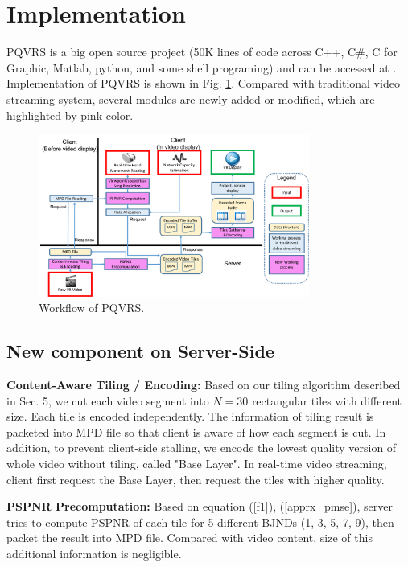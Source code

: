 \section{Implementation}

PQVRS is a big open source project (50K lines of code across C++, C\#, C for Graphic, Matlab, python, and some shell programing) and can be accessed at \cite{github}. Implementation of PQVRS is shown in Fig. \ref{implementation}. Compared with traditional video streaming system, several modules are newly added or modified, which are highlighted by pink color.

\begin{figure}
  \centering
  \includegraphics[width=3.5in]{images/implementation.pdf}
  \caption{Workflow of PQVRS.}
  \label{implementation}
  \end{figure}

\subsection{New component on Server-Side}

\textbf{Content-Aware Tiling / Encoding:} Based on our tiling algorithm described in Sec. 5, we cut each video segment into $N = 30$ rectangular tiles with different size. Each tile is encoded independently. The information of tiling result is packeted into MPD file so that client is aware of how each segment is cut. In addition, to prevent client-side stalling, we encode the lowest quality version of whole video without tiling, called "Base Layer".\cite{buffer} In real-time video streaming, client first request the Base Layer, then request the tiles with higher quality.

\textbf{PSPNR Precomputation:} Based on equation (\ref{f1}), (\ref{apprx_pmse}), server tries to compute PSPNR of each tile for 5 different BJNDs (1, 3, 5, 7, 9), then packet the result into MPD file. Compared with video content, size of this additional information is negligible.

